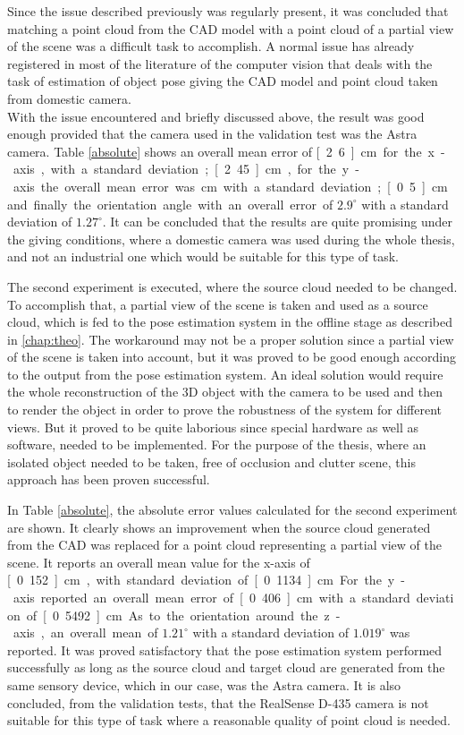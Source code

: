 Since the issue described previously was regularly present, it was concluded that matching a point cloud from the CAD model with a point cloud of a partial view of the scene was a difficult task to accomplish. A normal issue has already registered in most of the literature of the computer vision that deals with the task of estimation of object pose giving the CAD model and point cloud taken from domestic camera.	\\ 
With the issue encountered and briefly discussed above, the result was good enough provided that the camera used in the validation test was the Astra camera. Table \ref{absolute} shows an overall mean error of \unit[2.6] {cm} for the x-axis, with a standard deviation; \unit[2.45] {cm}, for the y-axis the overall mean error was \unit[0,63] {cm} with a standard deviation; \unit[0.5] {cm} and finally the orientation angle with an overall error of $2.9^{\circ}$ with a standard deviation of $1.27^{\circ}$. It can be concluded that the results are quite promising under the giving conditions, where a domestic camera was used during the whole thesis, and not an industrial one which would be suitable for this type of task. 

The second experiment is executed, where the source cloud needed to be changed. To accomplish that, a partial view of the scene is taken and used as a source cloud, which is fed to the pose estimation system in the offline stage as described in \ref{chap:theo}. The workaround may not be a proper solution since a partial view of the scene is taken into account, but it was proved to be good enough according to the output from the pose estimation system. An ideal solution would require the whole reconstruction of the 3D object with the camera to be used and then to render the object in order to prove the robustness of the system for different views. But it proved to be quite laborious since special hardware as well as software, needed to be implemented. For the purpose of the thesis, where an isolated object needed to be taken, free of occlusion and clutter scene, this approach has been proven successful.

In Table \ref{absolute}, the absolute error values calculated for the second experiment are shown. It clearly shows an improvement when the source cloud generated from the CAD was replaced for a point cloud representing a partial view of the scene. It reports an overall mean value for the x-axis of \unit[0.152] {cm},  with standard deviation of \unit[0.1134] {cm}. For the y-axis reported an overall mean error of \unit[0.406] {cm} with a standard deviation of \unit[0.5492] {cm}. As to the orientation around the z-axis, an overall mean of $1.21^{\circ}$ with a standard deviation of $1.019^{\circ}$ was reported. It was proved satisfactory that the pose estimation system performed successfully as long as the source cloud and target cloud are generated from the same sensory device, which in our case, was the Astra camera. It is also concluded, from the validation tests, that the RealSense D-435 camera is not suitable for this type of task where a reasonable quality of point cloud is needed.  



